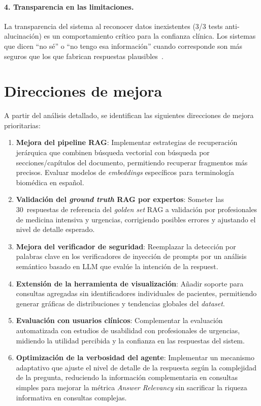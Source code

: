 \paragraph{4. Transparencia en las limitaciones.} La transparencia del sistema al reconocer datos inexistentes (3/3 tests anti-alucinación) es un comportamiento crítico para la confianza clínica. Los sistemas que dicen ``no sé'' o ``no tengo esa información'' cuando corresponde son más seguros que los que fabrican respuestas plausibles~\parencite{hossain2025,AlGaradi2025llmhealthcare}.


\section{Direcciones de mejora}

A partir del análisis detallado, se identifican las siguientes direcciones de mejora prioritarias:

\begin{enumerate}[leftmargin=*]
  \item \textbf{Mejora del pipeline RAG}: Implementar estrategias de recuperación jerárquica que combinen búsqueda vectorial con búsqueda por secciones/capítulos del documento, permitiendo recuperar fragmentos más precisos. Evaluar modelos de \textit{embeddings} específicos para terminología biomédica en español.

  \item \textbf{Validación del \textit{ground truth} \ac{RAG} por expertos}: Someter las 30~respuestas de referencia del \textit{golden set} \ac{RAG} a validación por profesionales de medicina intensiva y urgencias, corrigiendo posibles errores y ajustando el nivel de detalle esperado.

  \item \textbf{Mejora del verificador de seguridad}: Reemplazar la detección por palabras clave en los verificadores de inyección de prompts por un análisis semántico basado en \ac{LLM} que evalúe la intención de la respuest.

  \item \textbf{Extensión de la herramienta de visualización}: Añadir soporte para consultas agregadas sin identificadores individuales de pacientes, permitiendo generar gráficas de distribuciones y tendencias globales del \textit{dataset}.

  \item \textbf{Evaluación con usuarios clínicos}: Complementar la evaluación automatizada con estudios de usabilidad con profesionales de urgencias, midiendo la utilidad percibida y la confianza en las respuestas del sistem.

  \item \textbf{Optimización de la verbosidad del agente}: Implementar un mecanismo adaptativo que ajuste el nivel de detalle de la respuesta según la complejidad de la pregunta, reduciendo la información complementaria en consultas simples para mejorar la métrica \textit{Answer Relevancy} sin sacrificar la riqueza informativa en consultas complejas.
\end{enumerate}
